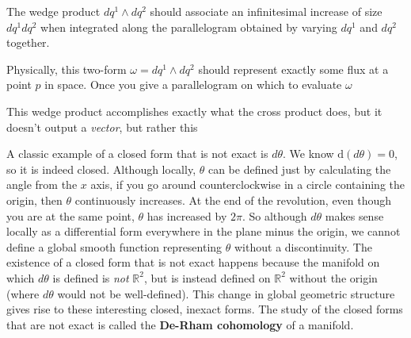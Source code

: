 	
	\begin{concept}
		The wedge product $dq^1 \wedge dq^2$ should associate an infinitesimal increase of size $dq^1 dq^2$ when integrated along the parallelogram obtained by varying $dq^1$ and $dq^2$ together. 
	\end{concept}
	Physically, this two-form $\omega = dq^1 \wedge dq^2$ should represent exactly some flux at a point $p$ in space. Once you give a parallelogram on which to evaluate $\omega$ 
	
	This wedge product accomplishes exactly what the cross product does, but it doesn't output a \emph{vector}, but rather this 
	
	
	
	
	A classic example of a closed form that is not exact is $d\theta$. We know $\mathrm d (d\theta) = 0$, so it is indeed closed. Although locally, $\theta$ can be defined just by calculating the angle from the $x$ axis, if you go around counterclockwise in a circle containing the origin, then $\theta$ continuously increases. At the end of the revolution, even though you are at the same point, $\theta$ has increased by $2\pi$. So although $d\theta$ makes sense locally as a differential form everywhere in the plane minus the origin, we cannot define a global smooth function representing $\theta$ without a discontinuity. The existence of a closed form that is not exact happens because the manifold on which $d\theta$ is defined is \emph{not} $\mathbb R^2$, but is instead defined on $\mathbb{R}^2$ without the origin (where $d\theta$ would not be well-defined). This change in global geometric structure gives rise to these interesting closed, inexact forms. The study of the closed forms that are not exact is called the \textbf{De-Rham cohomology} of a manifold. \\

